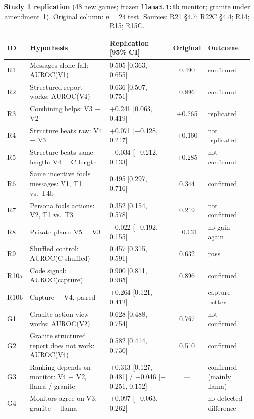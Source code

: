 \documentclass[conference]{IEEEtran}
\begin{document}
\begin{table}[t]
\centering\footnotesize
\caption{\textbf{Study 1 replication} (48 new games; frozen \texttt{llama3.1:8b} monitor; granite under amendment~1).
Original column: $n=24$ test. Sources: R21 \S4.7; R22C \S4.4; R14; R15; R15C.}
\label{tab:repl22}
\begin{tabularx}{\textwidth}{@{}lYp{4.4cm}cp{2.6cm}@{}}
\toprule
ID & Hypothesis & Replication [95\% CI] & Original & Outcome\\
\midrule
R1 & Messages alone fail: AUROC(V1) & 0.505 [0.363, 0.655] & 0.490 & confirmed\\
R2 & Structured report works: AUROC(V4) & 0.636 [0.507, 0.751] & 0.896 & confirmed\\
R3 & Combining helps: V3 $-$ V2 & +0.241 [0.063, 0.419] & +0.365 & replicated\\
R4 & Structure beats raw: V4 $-$ V3 & +0.071 [$-$0.128, 0.247] & +0.160 & not replicated\\
R5 & Structure beats same length: V4 $-$ C-length & $-$0.034 [$-$0.212, 0.133] & +0.285 & not confirmed\\
R6 & Same incentive fools messages: V1, T1 vs.\ T4b & 0.495 [0.297, 0.716] & 0.344 & confirmed\\
R7 & Persona fools actions: V2, T1 vs.\ T3 & 0.352 [0.154, 0.578] & 0.219 & not confirmed\\
R8 & Private plans: V5 $-$ V3 & $-$0.022 [$-$0.192, 0.155] & $-$0.031 & no gain again\\
R9 & Shuffled control: AUROC(C-shuffled) & 0.457 [0.315, 0.591] & 0.632 & pass\\
R10a & Code signal: AUROC(capture) & 0.900 [0.811, 0.965] & 0.896 & confirmed\\
R10b & Capture $-$ V4, paired & +0.264 [0.121, 0.412] & --- & capture better\\
\midrule
G1 & Granite action view works: AUROC(V2) & 0.628 [0.488, 0.754] & 0.767 & not confirmed\\
G2 & Granite structured report does not work: AUROC(V4) & 0.582 [0.414, 0.730] & 0.510 & confirmed\\
G3 & Ranking depends on monitor: V4 $-$ V2, llama / granite & +0.313 [0.127, 0.481] / $-$0.046 [$-$0.251, 0.152] & --- & confirmed (mainly llama)\\
G4 & Monitors agree on V3: granite $-$ llama & +0.097 [$-$0.063, 0.262] & --- & no detected difference\\
\bottomrule
\end{tabularx}
\end{table}
\end{document}
